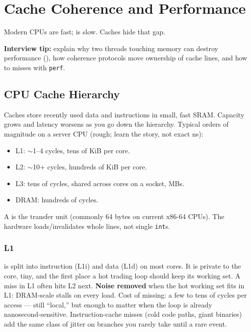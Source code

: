 \chapter{Cache Coherence and Performance}
\label{chap:cacheperformance}

Modern CPUs are fast;  is slow. Caches hide that gap.
\par\noindent\textbf{Interview tip:} explain why two threads touching 
 memory can destroy performance (), 
how coherence protocols move ownership of cache lines, and how to 
 misses with \texttt{perf}.

\section{CPU Cache Hierarchy}
\label{sec:cpu-cache-hierarchy}
Caches store recently used data and instructions in small, fast SRAM. 
Capacity grows and latency worsens as you go down the hierarchy. Typical 
orders of magnitude on a server CPU (rough; learn the story, not exact ns):
\begin{itemize}
    \item L1: $\sim$1--4 cycles, tens of KiB per core.
    \item L2: $\sim$10+ cycles, hundreds of KiB per core.
    \item L3: tens of cycles, shared across cores on a socket, MBs.
    \item DRAM: hundreds of cycles.
\end{itemize}
A  is the transfer unit (commonly 64 bytes on current x86-64 CPUs). 
The hardware loads/invalidates whole lines, not single \texttt{int}s.

\subsection{L1}
\label{subsec:cache-l1}
 is split into instruction (L1i) and data (L1d) on most cores. 
It is private to the core, tiny, and the first place a hot trading loop 
should keep its working set. A miss in L1 often hits L2 next.
\newline
\textbf{Noise removed} when the hot working set fits in L1: DRAM-scale stalls on every load. 
Cost of missing: a few to tens of cycles per access --- still ``local,'' but enough to matter 
when the loop is already nanosecond-sensitive. Instruction-cache misses (cold code paths, 
giant binaries) add the same class of jitter on branches you rarely take until a rare event.

